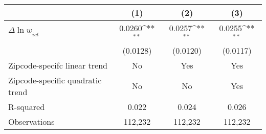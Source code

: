 {
\def\sym#1{\ifmmode^{#1}\else\(^{#1}\)\fi}
\begin{tabular}{l*{3}{c}}
\hline\hline
          &\multicolumn{1}{c}{(1)}         &\multicolumn{1}{c}{(2)}         &\multicolumn{1}{c}{(3)}         \\
\hline
$\Delta \ln \underline{w}_{ict}$&   0.0260\sym{**} &   0.0257\sym{**} &   0.0255\sym{**} \\
          & (0.0128)         & (0.0120)         & (0.0117)         \\
\hline
Zipcode-specifc linear trend&       No         &      Yes         &      Yes         \\
Zipcode-specific quadratic trend&       No         &       No         &      Yes         \\
R-squared &    0.022         &    0.024         &    0.026         \\
Observations&  112,232         &  112,232         &  112,232         \\
\hline\hline
\end{tabular}
}
